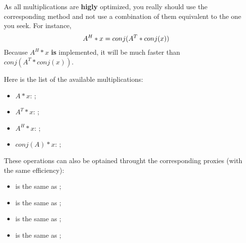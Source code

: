 \documentclass[letterpaper,10pt,english]{sphinxmanual}
\begin{document}
As all multiplications are \textbf{higly} optimized, you really should use the corresponding method and not use a combination of them equivalent to the one you seek. For instance,
\begin{gather}
\begin{split}A^H * x = conj(A^T * conj(x))\end{split}\notag
\end{gather}
Because \(A^H * x\) \textbf{is} implemented, it will be much faster than \(conj(A^T * conj(x))\).

Here is the list of the available multiplications:
\begin{itemize}
\item {} 
\(A * x\): ;

\item {} 
\(A^T * x\): ;

\item {} 
\(A^H * x\): ;

\item {} 
\(conj(A) * x\): ;

\end{itemize}

These operations can also be optained throught the corresponding proxies (with the same efficiency):
\begin{itemize}
\item {} 
 is the same as ;

\item {} 
 is the same as ;

\item {} 
 is the same as ;

\item {} 
 is the same as ;

\end{itemize}
\end{document}
